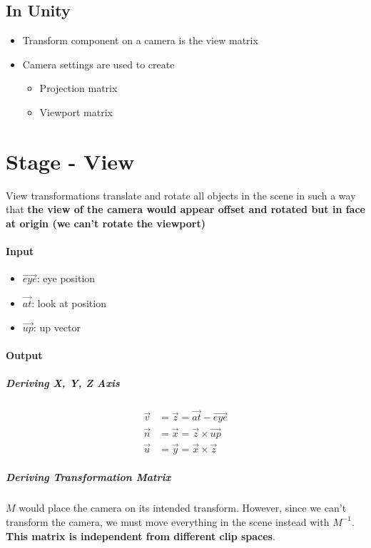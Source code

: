   \subsection{In Unity}

    \begin{itemize}
      \item Transform component on a camera is the view matrix
      \item Camera settings are used to create
      \begin{itemize}
        \item Projection matrix
        \item Viewport matrix
      \end{itemize}
    \end{itemize}

\section{Stage - View}

  View transformations translate and rotate all objects in the scene in such
  a way that \textbf{the view of the camera would appear offset and rotated but
  in face at origin (we can't rotate the viewport)}

  \paragraph{Input}
  \begin{itemize}
    \item $ \vec{eye} $: eye position
    \item $ \vec{at} $: look at position
    \item $ \vec{up} $: up vector
  \end{itemize}

  \paragraph{Output}
  \subparagraph{Deriving X, Y, Z Axis}
  \begin{align}
    \vec{v} &= \vec{z} = \vec{at} - \vec{eye} \\
    \vec{n} &= \vec{x} = \vec{z} \times \vec{up} \\
    \vec{u} &= \vec{y} = \vec{x} \times \vec{z}
  \end{align}

  \subparagraph{Deriving Transformation Matrix}
  $ M $ would place the camera on its intended transform. However, since
  we can't transform the camera, we must move everything in the scene instead
  with $ M^{-1} $. \textbf{This matrix is independent from different clip
  spaces}.

